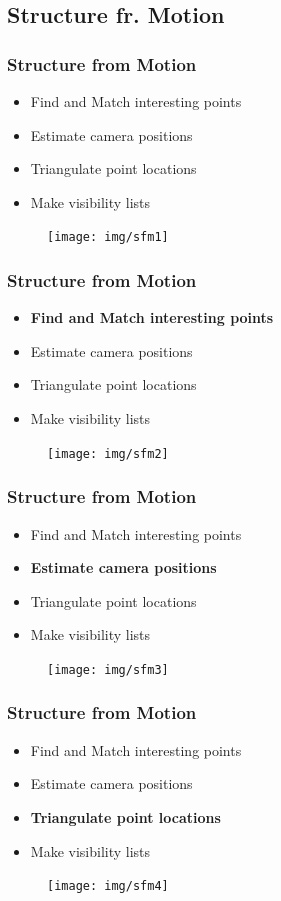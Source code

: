 \documentclass{beamer}
\begin{document}
\subsection{Structure fr. Motion}

\begin{frame}
  \frametitle{Structure from Motion}
  \begin{itemize}
    \item Find and Match interesting points
    \item Estimate camera positions
    \item Triangulate point locations
    \item Make visibility lists
  \end{itemize}
  \begin{figure}[htb!]
   \centering
   \texttt{[image: img/sfm1]}
  \end{figure}
\end{frame}

\begin{frame}
  \frametitle{Structure from Motion}
  \begin{itemize}
    \item \textbf{Find and Match interesting points}
    \item Estimate camera positions
    \item Triangulate point locations
    \item Make visibility lists
  \end{itemize}
  \begin{figure}[htb!]
   \centering
   \texttt{[image: img/sfm2]}
  \end{figure}
\end{frame}

\begin{frame}
  \frametitle{Structure from Motion}
  \begin{itemize}
    \item Find and Match interesting points
    \item \textbf{Estimate camera positions}
    \item Triangulate point locations
    \item Make visibility lists
  \end{itemize}
  \begin{figure}[htb!]
   \centering
   \texttt{[image: img/sfm3]}
  \end{figure}
\end{frame}

\begin{frame}
  \frametitle{Structure from Motion}
  \begin{itemize}
    \item Find and Match interesting points
    \item Estimate camera positions
    \item \textbf{Triangulate point locations}
    \item Make visibility lists
  \end{itemize}
  \begin{figure}[htb!]
   \centering
   \texttt{[image: img/sfm4]}
  \end{figure}
\end{frame}
\end{document}

